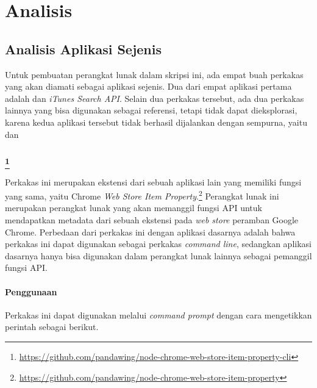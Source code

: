 \chapter{Analisis}
\label{chap:analysis}

\section{Analisis Aplikasi Sejenis}
\label{sec:analysis-similarapps}

Untuk pembuatan perangkat lunak dalam skripsi ini, ada empat buah perkakas \cl yang akan diamati sebagai aplikasi sejenis. Dua dari empat aplikasi pertama adalah \chromewebstorecli dan \textit{iTunes Search API}. Selain dua perkakas tersebut, ada dua perkakas lainnya yang bisa digunakan sebagai referensi, tetapi tidak dapat dieksplorasi, karena kedua aplikasi tersebut tidak berhasil dijalankan dengan sempurna, yaitu \ubercli dan \googlemapscli

\subsection{\chromewebstorecli\footnote{\href{https://github.com/pandawing/node-chrome-web-store-item-property-cli}{https://github.com/pandawing/node-chrome-web-store-item-property-cli}}}
\label{sec:similarapps-chromewebstore}

Perkakas \cl ini merupakan ekstensi dari sebuah aplikasi lain yang memiliki fungsi yang sama, yaitu Chrome \textit{Web Store Item Property}.\footnote{\href{https://github.com/pandawing/node-chrome-web-store-item-property}{https://github.com/pandawing/node-chrome-web-store-item-property}} Perangkat lunak \chromewebstorecli ini merupakan perangkat lunak yang akan memanggil fungsi API untuk mendapatkan metadata dari sebuah ekstensi pada \textit{web store} peramban Google Chrome. Perbedaan dari perkakas ini dengan aplikasi dasarnya adalah bahwa perkakas ini dapat digunakan sebagai perkakas \textit{command line}, sedangkan aplikasi dasarnya hanya bisa digunakan dalam perangkat lunak lainnya sebagai pemanggil fungsi API.

\subsubsection{Penggunaan}
\label{sec:similarapps-chromewebstore-usage}

Perkakas ini dapat digunakan melalui \textit{command prompt} dengan cara mengetikkan perintah sebagai berikut.

